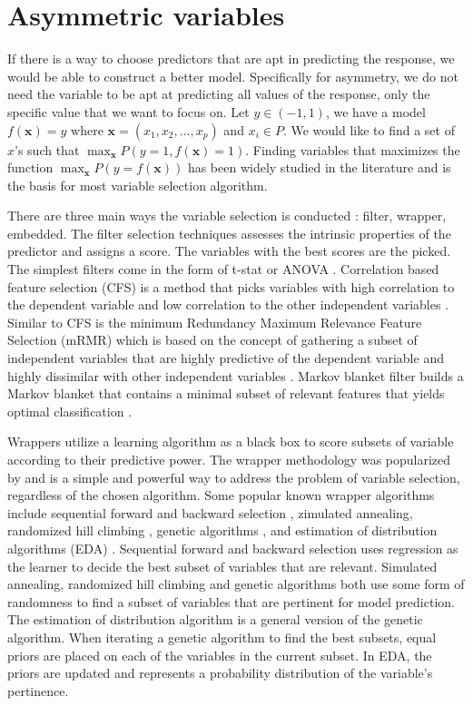 \section{Asymmetric variables}
If there is a way to choose predictors that are apt in predicting the response, we would be able to construct a better model. Specifically for asymmetry, we do not need the variable to be apt at predicting all values of the response, only the specific value that we want to focus on. Let $y \in (-1,1)$, we have a model $f(\mathbf{x})=y$ where $\mathbf{x} = (x_1,x_2,...,x_p)$ and $x_{i} \in P$. We would like to find a set of $x$'s such that $\displaystyle\max_{\mathbf{x}}P(y=1,f(\mathbf{x})=1)$. Finding variables that maximizes the function $\displaystyle\max_{\mathbf{x}}P(y=f(\mathbf{x}))$ has been widely studied in the literature and is the basis for most variable selection algorithm. 

There are three main ways the variable selection is conducted \citep{Saeys07} : filter, wrapper, embedded. The filter selection techniques assesses the intrinsic properties of the predictor and assigns a score. The variables with the best scores are the picked. The simplest filters come in the form of t-stat or ANOVA  \citep{Jafari06}. Correlation based feature selection (CFS) is a method that picks variables with high correlation to the dependent variable and low correlation to the other independent variables \citep{Hall99}. Similar to CFS is the minimum Redundancy Maximum Relevance Feature Selection (mRMR) which is based on the concept of gathering a subset of independent variables that are highly predictive of the dependent variable and highly dissimilar with other independent variables \citep{Ding03}. Markov blanket filter builds a Markov blanket that contains a minimal subset of relevant features that yields optimal classification \citep{Zeng09}. 

Wrappers utilize a learning algorithm as a black box to score subsets of variable according to their predictive power. The wrapper methodology was popularized by \citet{Kohavi96} and is a simple and powerful way to address the problem of variable selection, regardless of the chosen algorithm. Some popular known wrapper algorithms include sequential forward and backward selection \citep{Kittler78}, zimulated annealing\citep{Kirkpatrick83}, randomized hill climbing \citep{Skalak94}, genetic algorithms \citep{Holland75}, and estimation of distribution algorithms (EDA) \citep{Blanco04}. Sequential forward and backward selection uses regression as the learner to decide the best subset of variables that are relevant. Simulated annealing, randomized hill climbing and genetic algorithms both use some form of randomness to find a subset of variables that are pertinent for model prediction. The estimation of distribution algorithm is a general version of the genetic algorithm. When iterating a genetic algorithm to find the best subsets, equal priors are placed on each of the variables in the current subset. In EDA, the priors are updated and represents a probability distribution of the variable's pertinence. 

